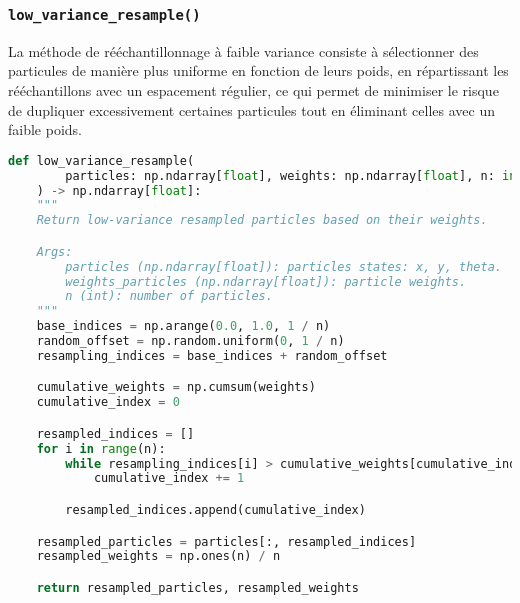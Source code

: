 \documentclass[../CSC_5RO12_TA_TP3.tex]{subfiles}
\begin{document}
\subsubsection{\texttt{low\_variance\_resample()}}
\begin{definition}
    La méthode de rééchantillonnage à faible variance consiste à sélectionner des particules de manière plus uniforme en fonction de leurs poids, en répartissant les rééchantillons avec un espacement régulier, ce qui permet de minimiser le risque de dupliquer excessivement certaines particules tout en éliminant celles avec un faible poids.

    \begin{scriptsize}\mycode
        \begin{lstlisting}[language=Python, caption=\texttt{low\_variance\_resample()}]
def low_variance_resample(
        particles: np.ndarray[float], weights: np.ndarray[float], n: int
    ) -> np.ndarray[float]:
    """
    Return low-variance resampled particles based on their weights.

    Args:
        particles (np.ndarray[float]): particles states: x, y, theta.
        weights_particles (np.ndarray[float]): particle weights.
        n (int): number of particles.
    """
    base_indices = np.arange(0.0, 1.0, 1 / n)
    random_offset = np.random.uniform(0, 1 / n)
    resampling_indices = base_indices + random_offset

    cumulative_weights = np.cumsum(weights)
    cumulative_index = 0

    resampled_indices = []
    for i in range(n):
        while resampling_indices[i] > cumulative_weights[cumulative_index]:
            cumulative_index += 1

        resampled_indices.append(cumulative_index)

    resampled_particles = particles[:, resampled_indices]
    resampled_weights = np.ones(n) / n

    return resampled_particles, resampled_weights
        \end{lstlisting}
    \end{scriptsize}
\end{definition}
\end{document}
